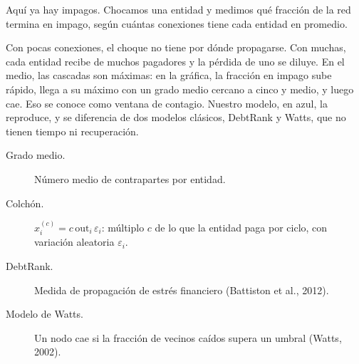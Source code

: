 \begin{decir}
Aquí ya hay impagos. Chocamos una entidad y medimos qué fracción de la red termina en
impago, según cuántas conexiones tiene cada entidad en promedio.

Con pocas conexiones, el choque no tiene por dónde propagarse. Con muchas, cada entidad
recibe de muchos pagadores y la pérdida de uno se diluye. En el medio, las cascadas son
máximas: en la gráfica, la fracción en impago sube rápido, llega a su máximo con un grado
medio cercano a cinco y medio, y luego cae. Eso se conoce como ventana de contagio. Nuestro modelo, en azul, la reproduce,
y se diferencia de dos modelos clásicos, DebtRank y Watts, que no tienen tiempo ni
recuperación.
\end{decir}
\begin{terminos}
\begin{description}
\item[Grado medio.] Número medio de contrapartes por entidad.
\item[Colchón.] $x_i^{(c)}=c\,\mathrm{out}_i\,\varepsilon_i$: múltiplo $c$ de lo que la
entidad paga por ciclo, con variación aleatoria $\varepsilon_i$.
\item[DebtRank.] Medida de propagación de estrés financiero (Battiston et al., 2012).
\item[Modelo de Watts.] Un nodo cae si la fracción de vecinos caídos supera un umbral
(Watts, 2002).
\end{description}
\end{terminos}

